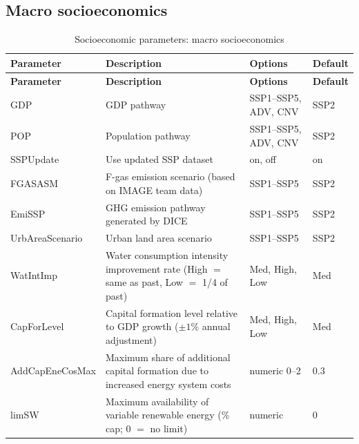 \documentclass[10pt,a4paper,titlepage,dvipdfmx]{book}
\begin{document}
\subsection{Macro socioeconomics}
\begin{longtable}{|p{}|p{}|p{}|p{}|}
\caption{Socioeconomic parameters: macro socioeconomics}\label{tab:sp-soc-macro}\\
\hline
\textbf{Parameter} & \textbf{Description} & \textbf{Options} & \textbf{Default} \\ \hline
\endfirsthead
\hline
\textbf{Parameter} & \textbf{Description} & \textbf{Options} & \textbf{Default} \\ \hline
\endhead
\hline
\endfoot
GDP & GDP pathway & SSP1--SSP5, ADV, CNV & SSP2 \\ \hline
POP & Population pathway & SSP1--SSP5, ADV, CNV & SSP2 \\ \hline
SSPUpdate & Use updated SSP dataset & on, off & on \\ \hline
FGASASM & F-gas emission scenario (based on IMAGE team data) & SSP1--SSP5 & SSP2 \\ \hline
EmiSSP & GHG emission pathway generated by DICE & SSP1--SSP5 & SSP2 \\ \hline
UrbAreaScenario & Urban land area scenario & SSP1--SSP5 & SSP2 \\ \hline
WatIntImp & Water consumption intensity improvement rate (High $=$ same as past, Low $=$ 1/4 of past) & Med, High, Low & Med \\ \hline
CapForLevel & Capital formation level relative to GDP growth ($\pm1\%$ annual adjustment) & Med, High, Low & Med \\ \hline
AddCapEneCosMax & Maximum share of additional capital formation due to increased energy system costs & numeric 0--2 & 0.3 \\ \hline
limSW & Maximum availability of variable renewable energy (\% cap; 0 $=$ no limit) & numeric & 0 \\ \hline
\end{longtable}
\end{document}
